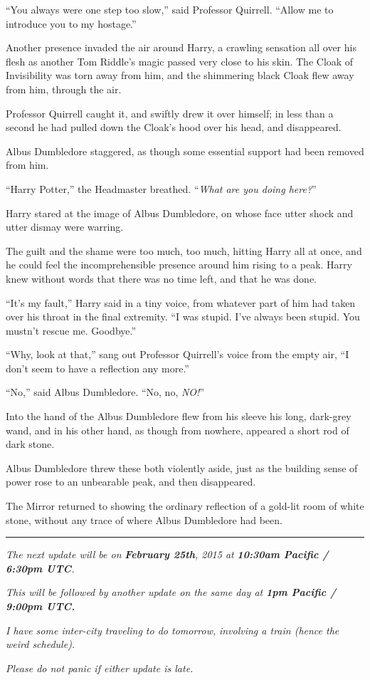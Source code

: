 ``You always were one step too slow,'' said Professor Quirrell. ``Allow me to introduce you to my hostage.''

Another presence invaded the air around Harry, a crawling sensation all over his flesh as another Tom Riddle's magic passed very close to his skin. The Cloak of Invisibility was torn away from him, and the shimmering black Cloak flew away from him, through the air.

Professor Quirrell caught it, and swiftly drew it over himself; in less than a second he had pulled down the Cloak's hood over his head, and disappeared.

Albus Dumbledore staggered, as though some essential support had been removed from him.

``Harry Potter,'' the Headmaster breathed. ``\emph{What are you doing here?}''

Harry stared at the image of Albus Dumbledore, on whose face utter shock and utter dismay were warring.

The guilt and the shame were too much, too much, hitting Harry all at once, and he could feel the incomprehensible presence around him rising to a peak. Harry knew without words that there was no time left, and that he was done.

``It's my fault,'' Harry said in a tiny voice, from whatever part of him had taken over his throat in the final extremity. ``I was stupid. I've always been stupid. You mustn't rescue me. Goodbye.''

``Why, look at that,'' sang out Professor Quirrell's voice from the empty air, ``I don't seem to have a reflection any more.''

``No,'' said Albus Dumbledore. ``No, no, \emph{NO!}''

Into the hand of the Albus Dumbledore flew from his sleeve his long, dark-grey wand, and in his other hand, as though from nowhere, appeared a short rod of dark stone.

Albus Dumbledore threw these both violently aside, just as the building sense of power rose to an unbearable peak, and then disappeared.

The Mirror returned to showing the ordinary reflection of a gold-lit room of white stone, without any trace of where Albus Dumbledore had been.

\begin{center}\rule{3in}{0.4pt}\end{center}

\emph{The next update will be on} \emph{\textbf{February 25th}}\emph{, 2015 at} \emph{\textbf{10:30am Pacific / 6:30pm UTC}}\emph{.}

\emph{This will be followed by another update on the same day at} \emph{\textbf{1pm Pacific / 9:00pm UTC.}}

\emph{I have some inter-city traveling to do tomorrow,} \emph{involving a train (hence the weird schedule).}

\emph{Please do not panic if either update is late.}
